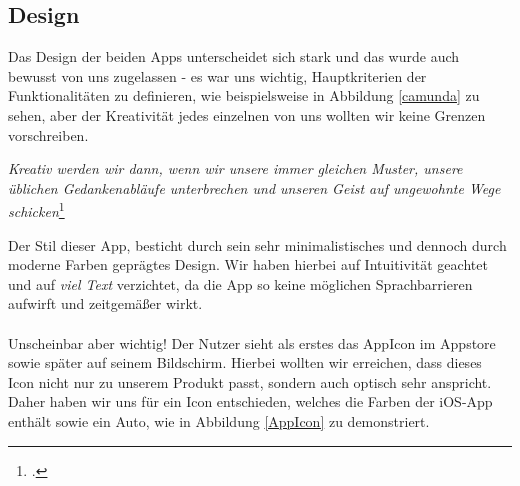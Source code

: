 \subsection{Design}
Das Design der beiden Apps unterscheidet sich stark und das wurde auch bewusst von uns zugelassen - es war uns wichtig, Hauptkriterien der Funktionalitäten zu definieren, wie beispielsweise in Abbildung \ref{camunda} zu sehen, aber der Kreativität jedes einzelnen von uns wollten wir keine Grenzen vorschreiben.
\\
\begin{center}
	\textit{Kreativ werden wir dann, wenn wir unsere immer gleichen Muster, unsere üblichen Gedankenabläufe unterbrechen und unseren Geist auf ungewohnte Wege schicken}\footcite{Bode2022}
\end{center}
Der Stil dieser App, besticht durch sein sehr minimalistisches und dennoch durch moderne Farben geprägtes Design. Wir haben hierbei auf Intuitivität geachtet und auf  \textit{viel Text} verzichtet, da die App so keine möglichen Sprachbarrieren aufwirft und zeitgemäßer wirkt.
\\
\\
Unscheinbar aber wichtig! Der Nutzer sieht als erstes das AppIcon im Appstore sowie später auf seinem Bildschirm. Hierbei wollten wir erreichen, dass dieses Icon nicht nur zu unserem Produkt passt, sondern auch optisch sehr anspricht. Daher haben wir uns für ein Icon entschieden, welches die Farben der iOS-App enthält sowie ein Auto, wie in Abbildung \ref{AppIcon} zu demonstriert.
